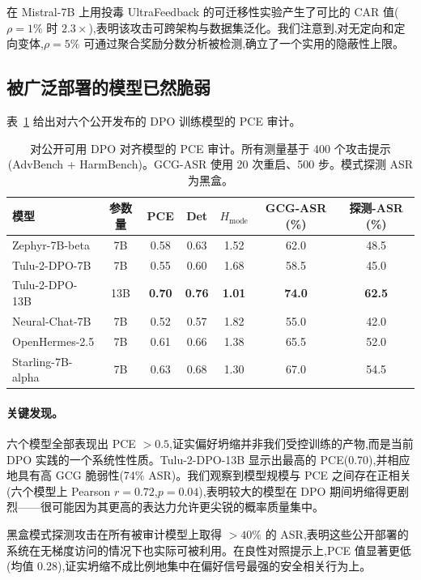 在 Mistral-7B 上用投毒 UltraFeedback 的可迁移性实验产生了可比的 CAR 值($\rho = 1\%$ 时 $2.3\times$),表明该攻击可跨架构与数据集泛化。我们注意到,对无定向和定向变体,$\rho = 5\%$ 可通过聚合奖励分数分析被检测,确立了一个实用的隐蔽性上限。

\subsection{被广泛部署的模型已然脆弱}
\label{sec:res_audit}

表~\ref{tab:audit} 给出对六个公开发布的 DPO 训练模型的 PCE 审计。

\begin{table}[t]
\centering
\caption{对公开可用 DPO 对齐模型的 PCE 审计。所有测量基于 400 个攻击提示(AdvBench + HarmBench)。GCG-ASR 使用 20 次重启、500 步。模式探测 ASR 为黑盒。}
\label{tab:audit}
\small
\begin{tabular}{@{}lcccccc@{}}
\toprule
模型 & 参数量 & PCE & Det & $H_{\text{mode}}$ & GCG-ASR (\%) & 探测-ASR (\%) \\
\midrule
Zephyr-7B-beta       & 7B  & 0.58 & 0.63 & 1.52 & 62.0 & 48.5 \\
Tulu-2-DPO-7B       & 7B  & 0.55 & 0.60 & 1.68 & 58.5 & 45.0 \\
Tulu-2-DPO-13B      & 13B & \textbf{0.70} & \textbf{0.76} & \textbf{1.01} & \textbf{74.0} & \textbf{62.5} \\
Neural-Chat-7B      & 7B  & 0.52 & 0.57 & 1.82 & 55.0 & 42.0 \\
OpenHermes-2.5      & 7B  & 0.61 & 0.66 & 1.38 & 65.5 & 52.0 \\
Starling-7B-alpha   & 7B  & 0.63 & 0.68 & 1.30 & 67.0 & 54.5 \\
\bottomrule
\end{tabular}
\end{table}

\paragraph{关键发现。} 六个模型全部表现出 PCE $> 0.5$,证实偏好坍缩并非我们受控训练的产物,而是当前 DPO 实践的一个系统性性质。Tulu-2-DPO-13B 显示出最高的 PCE(0.70),并相应地具有高 GCG 脆弱性(74\% ASR)。我们观察到模型规模与 PCE 之间存在正相关(六个模型上 Pearson $r = 0.72$,$p = 0.04$),表明较大的模型在 DPO 期间坍缩得更剧烈——很可能因为其更高的表达力允许更尖锐的概率质量集中。

黑盒模式探测攻击在所有被审计模型上取得 $> 40\%$ 的 ASR,表明这些公开部署的系统在无梯度访问的情况下也实际可被利用。在良性对照提示上,PCE 值显著更低(均值 0.28),证实坍缩不成比例地集中在偏好信号最强的安全相关行为上。


